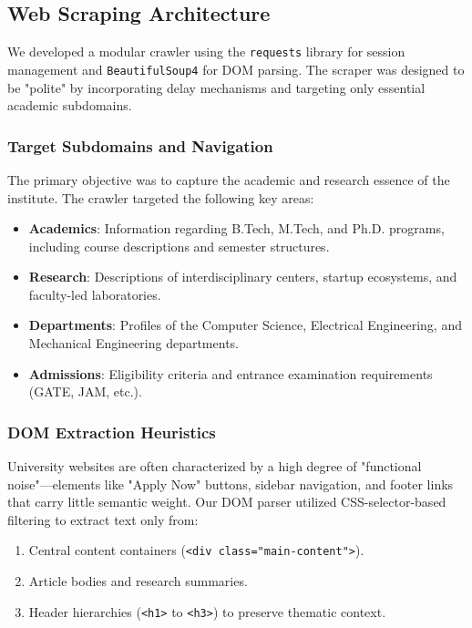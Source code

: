 \documentclass[12pt,a4paper]{article}
\begin{document}
\subsection{Web Scraping Architecture}
We developed a modular crawler using the \texttt{requests} library for session management and \texttt{BeautifulSoup4} for DOM parsing. The scraper was designed to be "polite" by incorporating delay mechanisms and targeting only essential academic subdomains.

\subsubsection{Target Subdomains and Navigation}
The primary objective was to capture the academic and research essence of the institute. The crawler targeted the following key areas:
\begin{itemize}
    \item \textbf{Academics}: Information regarding B.Tech, M.Tech, and Ph.D. programs, including course descriptions and semester structures.
    \item \textbf{Research}: Descriptions of interdisciplinary centers, startup ecosystems, and faculty-led laboratories.
    \item \textbf{Departments}: Profiles of the Computer Science, Electrical Engineering, and Mechanical Engineering departments.
    \item \textbf{Admissions}: Eligibility criteria and entrance examination requirements (GATE, JAM, etc.).
\end{itemize}

\subsubsection{DOM Extraction Heuristics}
University websites are often characterized by a high degree of "functional noise"—elements like "Apply Now" buttons, sidebar navigation, and footer links that carry little semantic weight. Our DOM parser utilized CSS-selector-based filtering to extract text only from:
\begin{enumerate}
    \item Central content containers (\texttt{<div class="main-content">}).
    \item Article bodies and research summaries.
    \item Header hierarchies (\texttt{<h1>} to \texttt{<h3>}) to preserve thematic context.
\end{enumerate}
\end{document}

